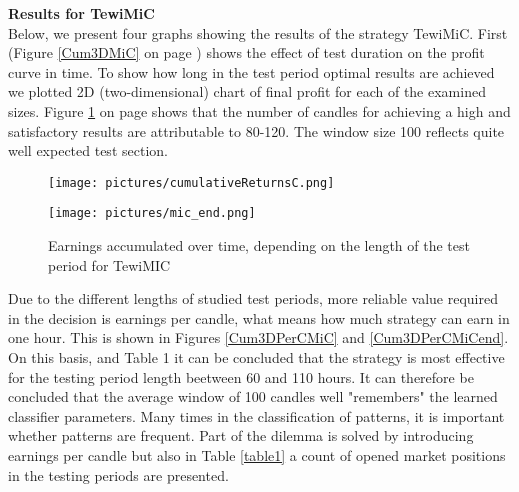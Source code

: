\documentclass{tewiart}
\begin{document}
\textbf{Results for TewiMiC}\\
Below, we present four graphs showing the results of the strategy TewiMiC. First (Figure \ref{Cum3DMiC} on page \pageref{Cum3DMiC}) shows the effect of test duration on the profit curve in time. To show how long in the test period optimal results are achieved we plotted 2D (two-dimensional) chart of final profit for each of the examined sizes. Figure \ref{Cum3DMiCend} on page \pageref{Cum3DMiCend} shows that the number of candles for achieving a high and satisfactory results are attributable to 80-120. The window size 100 reflects quite well expected test section.

\begin{figure}[h!]
\begin{minipage}{.49\linewidth}
\begin{center}
\texttt{[image: pictures/cumulativeReturnsC.png]}
\label{Cum3DMiC}
\end{center}
\end{minipage}
\begin{minipage}{.49\linewidth}
\begin{center}
\texttt{[image: pictures/mic\_end.png]}
\label{Cum3DMiCend}
\end{center}
\end{minipage}
\caption{Earnings accumulated over time, depending on the length of the test period for TewiMIC}
\end{figure}
\FloatBarrier

Due to the different lengths of studied test periods, more reliable value required in the decision is earnings per candle, what means how much strategy can earn in one hour. This is shown in Figures \ref{Cum3DPerCMiC} and \ref{Cum3DPerCMiCend}. On this basis, and Table 1 it can be concluded that the strategy is most effective for the testing period length beetween 60 and 110 hours. It can therefore be concluded that the average window of 100 candles well "remembers" the learned classifier parameters. Many times in the classification of patterns, it is important whether patterns are frequent. Part of the dilemma is solved by introducing earnings per candle but also in Table \ref{table1} a count of opened market positions in the testing periods are presented.\\
\end{document}
